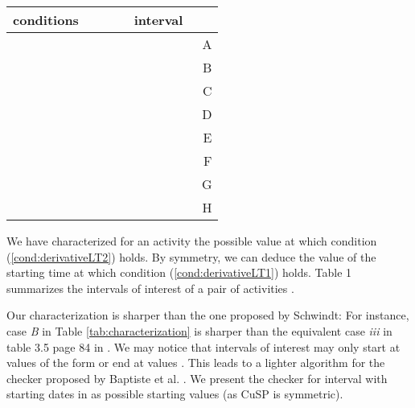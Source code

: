 \documentclass{llncs}
\begin{document}
\fi
\newcommand\myLe{\!\le\!}
\newcommand\myGe{\!\ge\!}
\newcommand\myWedge{~\wedge~}
\newcommand\myPlus{\!+\!}
\newcommand\myMoins{\!-\!}
{
\begin{table}[!ht]
\vspace{-1.0cm}
\begin{minipage}{\textwidth}
\centering
{}
\begin{tabular}{|lll|r|}\cline{1-3}
\linespread{0.8}
\scriptsize
conditions &~~~~& interval \\ \hline
\scriptsize

&&    & ~A\\
\scriptsize

&&   & B\\
\scriptsize

&& & C\\
\scriptsize

&& &D\\
\scriptsize

&& & E\\
\scriptsize

&&  &F\\
\scriptsize

&& &G\\
\scriptsize

&& &H\\ \hline
\end{tabular}
\end{minipage}
\vspace{-0.7cm}
\end{table}
}




 We have characterized for an activity  the possible value at which condition (\ref{cond:derivativeLT2}) holds. By symmetry, we can deduce the value of the starting time at which condition (\ref{cond:derivativeLT1}) holds.
Table 1 summarizes the intervals of interest of a pair of activities . 

Our characterization is sharper than the one proposed by Schwindt: For instance, case \emph{B} in Table \ref{tab:characterization} is sharper than the 
equivalent case \emph{iii} in table 3.5 page 84 in \cite{schwindt98:PhD}.
We may notice that intervals of interest may only start at values of the form  or end at values .
This leads to a  lighter algorithm for the  checker proposed by Baptiste et al. \cite{baptiste:inria-00123562}.
We present the checker for interval with starting dates in   as possible starting values (as CuSP is symmetric).
\end{document}
